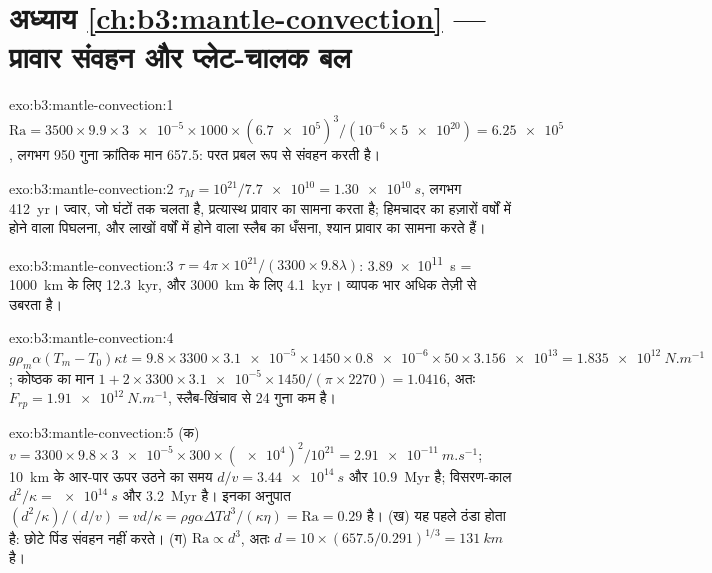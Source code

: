 \section*{अध्याय \ref{ch:b3:mantle-convection} --- प्रावार संवहन और प्लेट-चालक बल}

\begin{solution}{exo:b3:mantle-convection:1}
$\mathrm{Ra} = 3500\times9.9\times\num{3e-5}\times1000\times(\num{6.7e5})^3/
(10^{-6}\times\num{5e20}) = \num{6.25e5}$, लगभग 950 गुना क्रांतिक
मान 657.5: परत प्रबल रूप से संवहन करती है।
\end{solution}

\begin{solution}{exo:b3:mantle-convection:2}
$\tau_M = 10^{21}/\num{7.7e10} = \qty{1.30e10}{s}$, लगभग \qty{412}{yr}।
ज्वार, जो घंटों तक चलता है, प्रत्यास्थ प्रावार का सामना करता है; हिमचादर का
हज़ारों वर्षों में होने वाला पिघलना, और लाखों वर्षों में होने वाला स्लैब का धँसना,
श्यान प्रावार का सामना करते हैं।
\end{solution}

\begin{solution}{exo:b3:mantle-convection:3}
$\tau = 4\pi\times10^{21}/(3300\times9.8\lambda)$: \qty{3.89e11}{s} =
\qty{1000}{km} के लिए \qty{12.3}{kyr}, और \qty{3000}{km} के लिए \qty{4.1}{kyr}।
व्यापक भार अधिक तेज़ी से उबरता है।
\end{solution}

\begin{solution}{exo:b3:mantle-convection:4}
$g\rho_m\alpha(T_m - T_0)\kappa t = 9.8\times3300\times\num{3.1e-5}\times1450
\times\num{0.8e-6}\times50\times\num{3.156e13} = \qty{1.835e12}{N.m^{-1}}$; कोष्ठक का
मान $1 + 2\times3300\times\num{3.1e-5}\times1450/(\pi\times2270) = 1.0416$,
अतः $F_{rp} = \qty{1.91e12}{N.m^{-1}}$, स्लैब-खिंचाव से 24 गुना कम है।
\end{solution}

\begin{solution}{exo:b3:mantle-convection:5}
(क) $v = 3300\times9.8\times\num{3e-5}\times300\times(\num{e4})^2/10^{21} =
\qty{2.91e-11}{m.s^{-1}}$; \qty{10}{km} के आर-पार ऊपर उठने का समय $d/v =
\qty{3.44e14}{s}$ और \qty{10.9}{Myr} है; विसरण-काल $d^2/\kappa =
\qty{e14}{s}$ और \qty{3.2}{Myr} है। इनका अनुपात $(d^2/\kappa)/(d/v) =
vd/\kappa = \rho g\alpha\Delta Td^3/(\kappa\eta) = \mathrm{Ra} = 0.29$ है। (ख) यह
पहले ठंडा होता है: छोटे पिंड संवहन नहीं करते। (ग) $\mathrm{Ra} \propto d^3$, अतः $d =
10\times(657.5/0.291)^{1/3} = \qty{131}{km}$ है।
\end{solution}

